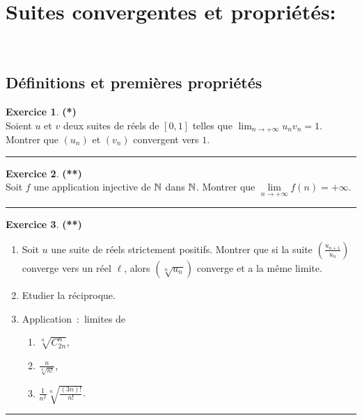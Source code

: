 \documentclass[a4paper,11pt]{article}
\theoremstyle{definition}
\newtheorem{exo}{Exercice} %
\begin{document}
\section*{Suites convergentes et propriétés:}\hfill\\%
\begin{minipage}{1\linewidth}
	\begin{minipage}[c]{0.48\linewidth}
		\raggedright
		
\subsection*{Définitions et premières propriétés}

\begin{exo}\textbf{(*)}\quad\\[0.2cm]
	Soient $u$ et $v$ deux suites de réels de $[0,1]$ telles que $\lim_{n\rightarrow +\infty}u_nv_n=1$. Montrer que $(u_n)$ et $(v_n)$ convergent vers $1$.


\centering
\rule{1\linewidth}{0.6pt}
\end{exo}

\begin{exo}\textbf{(**)}\quad\\[0.2cm]
	Soit $f$ une application injective de $\mathbb{N}$ dans $\mathbb{N}$. Montrer que $\lim\limits_{n\rightarrow +\infty}f(n)=+\infty$.

\centering
\rule{1\linewidth}{0.6pt}
\end{exo}


\begin{exo}\textbf{(**)}\quad\\[0.2cm]
\begin{enumerate}
	\item  Soit $u$ une suite de réels strictement positifs. Montrer que si la suite $(\frac{u_{n+1}}{u_n})$ converge vers un réel $\ell$, alors $(\sqrt[n]{u_n})$ converge et a la même limite.
	\item  Etudier la réciproque.
	\item  Application~:~limites de 
	\begin{enumerate}
		\item $\sqrt[n]{C_{2n}^n}$,
		\item $\frac{n}{\sqrt[n]{n!}}$,
		\item $\frac{1}{n^2}\sqrt[n]{\frac{(3n)!}{n!}}$.
	\end{enumerate}
\end{enumerate}

		
\centering
\rule{1\linewidth}{0.6pt}
\end{exo}				





\end{minipage}
\end{minipage}
\end{document}
